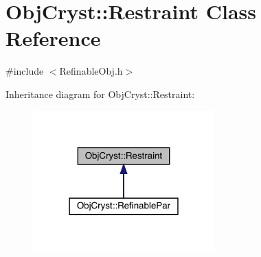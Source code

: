 \hypertarget{class_obj_cryst_1_1_restraint}{}\section{Obj\+Cryst\+::Restraint Class Reference}
\label{class_obj_cryst_1_1_restraint}


{\ttfamily \#include $<$Refinable\+Obj.\+h$>$}



Inheritance diagram for Obj\+Cryst\+::Restraint\+:
\nopagebreak
\begin{figure}[H]
\begin{center}
\leavevmode
\includegraphics[width=198pt]{class_obj_cryst_1_1_restraint__inherit__graph}
\end{center}
\end{figure}
